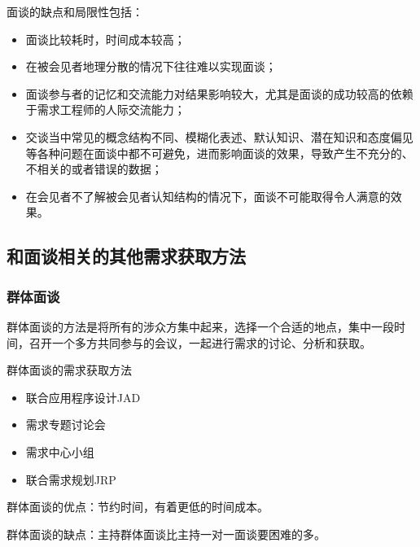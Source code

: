 面谈的缺点和局限性包括：
\begin{itemize}
    \item 面谈比较耗时，时间成本较高；
    \item 在被会见者地理分散的情况下往往难以实现面谈；
    \item 面谈参与者的记忆和交流能力对结果影响较大，尤其是面谈的成功较高的依赖于需求工程师的人际交流能力；
    \item 交谈当中常见的概念结构不同、模糊化表述、默认知识、潜在知识和态度偏见等各种问题在面谈中都不可避免，进而影响面谈的效果，导致产生不充分的、不相关的或者错误的数据；
    \item 在会见者不了解被会见者认知结构的情况下，面谈不可能取得令人满意的效果。
\end{itemize}

\subsection{和面谈相关的其他需求获取方法}

\subsubsection{群体面谈}
群体面谈的方法是将所有的涉众方集中起来，选择一个合适的地点，集中一段时间，召开一个多方共同参与的会议，一起进行需求的讨论、分析和获取。

群体面谈的需求获取方法
\vspace{-0.8em}
\begin{multicols}{2}
    \begin{itemize}
        \item 联合应用程序设计JAD
        \item 需求专题讨论会
        \item 需求中心小组
        \item 联合需求规划JRP
    \end{itemize}
\end{multicols}
\vspace{-1em}

群体面谈的优点：节约时间，有着更低的时间成本。

群体面谈的缺点：主持群体面谈比主持一对一面谈要困难的多。

